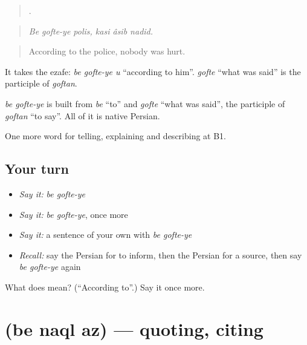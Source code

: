 \begin{quote}
     .
\end{quote}

\begin{quote}
\emph{Be gofte-ye polis, kasi âsib nadid.}
\end{quote}

\begin{quote}
According to the police, nobody was hurt.
\end{quote}

It takes the ezafe: \emph{be gofte-ye u} \textquotedblleft{}according to him\textquotedblright{}. \emph{gofte} \textquotedblleft{}what was said\textquotedblright{} is the participle of \emph{goftan}.

\begin{cousinweb}
\emph{be gofte-ye} is built from \emph{be} \textquotedblleft{}to\textquotedblright{} and \emph{gofte} \textquotedblleft{}what was said\textquotedblright{}, the participle of \emph{goftan} \textquotedblleft{}to say\textquotedblright{}. All of it is native Persian.
\end{cousinweb}

\begin{grammarlens}[title={What you've built}]
One more word for telling, explaining and describing at B1.
\end{grammarlens}

\subsection*{Your turn}
\begin{itemize}
\raggedright
  \item \emph{Say it:} \emph{be gofte-ye}
  \item \emph{Say it:} \emph{be gofte-ye}, once more
  \item \emph{Say it:} a sentence of your own with \emph{be gofte-ye}
  \item \emph{Recall:} say the Persian for to inform, then the Persian for a source, then say \emph{be gofte-ye} again
\end{itemize}

\begin{tcolorbox}[breakable,colback=teal!4,colframe=teal!35!black,title={Before you move on}]
What does   mean? (\textquotedblleft{}According to\textquotedblright{}.) Say it once more.
\end{tcolorbox}
\section[\texorpdfstring{\fa{به} \fa{نقل} \fa{از} (be naql az)}{به نقل از (be naql az)}]{   (be naql az) — quoting, citing}

